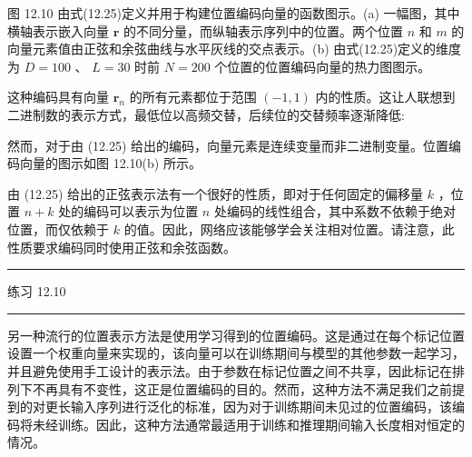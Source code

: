 \documentclass[10pt]{article}
\newcommand{\HRule}{\begin{center}\rule{0.9\linewidth}{0.2mm}\end{center}}
\begin{document}
图 12.10 由式(12.25)定义并用于构建位置编码向量的函数图示。(a) 一幅图，其中横轴表示嵌入向量 \(\mathbf{r}\) 的不同分量，而纵轴表示序列中的位置。两个位置 \(n\) 和 \(m\) 的向量元素值由正弦和余弦曲线与水平灰线的交点表示。(b) 由式(12.25)定义的维度为 \(D = {100}\) 、 \(L = {30}\) 时前 \(N = {200}\) 个位置的位置编码向量的热力图图示。

这种编码具有向量 \({\mathbf{r}}_{n}\) 的所有元素都位于范围 \(\left( {-1,1}\right)\) 内的性质。这让人联想到二进制数的表示方式，最低位以高频交替，后续位的交替频率逐渐降低:

\begin{center}
\end{center}

然而，对于由 (12.25) 给出的编码，向量元素是连续变量而非二进制变量。位置编码向量的图示如图 12.10(b) 所示。

由 (12.25) 给出的正弦表示法有一个很好的性质，即对于任何固定的偏移量 \(k\) ，位置 \(n + k\) 处的编码可以表示为位置 \(n\) 处编码的线性组合，其中系数不依赖于绝对位置，而仅依赖于 \(k\) 的值。因此，网络应该能够学会关注相对位置。请注意，此性质要求编码同时使用正弦和余弦函数。

\HRule

练习 12.10

\HRule

另一种流行的位置表示方法是使用学习得到的位置编码。这是通过在每个标记位置设置一个权重向量来实现的，该向量可以在训练期间与模型的其他参数一起学习，并且避免使用手工设计的表示法。由于参数在标记位置之间不共享，因此标记在排列下不再具有不变性，这正是位置编码的目的。然而，这种方法不满足我们之前提到的对更长输入序列进行泛化的标准，因为对于训练期间未见过的位置编码，该编码将未经训练。因此，这种方法通常最适用于训练和推理期间输入长度相对恒定的情况。
\end{document}
